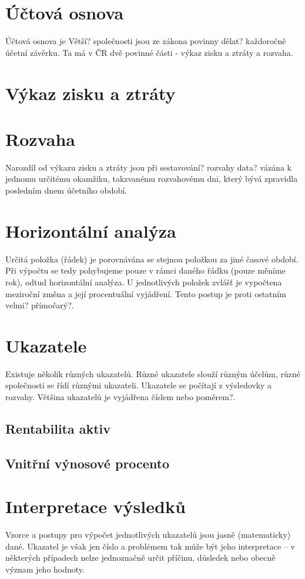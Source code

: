 \section{Účtová osnova}
Účtová osnova je 
Větší? společnosti jsou ze zákona povinny dělat? každoročně účetní závěrku. Ta má v ČR dvě povinné části - výkaz zisku a ztráty a rozvaha. 
\section{Výkaz zisku a ztráty}
\section{Rozvaha}
Narozdíl od výkazu zisku a ztráty jsou při sestavování? rozvahy data? vázána k jednomu určitému okamžiku, takzvanému rozvahovému dni, který bývá zpravidla posledním dnem účetního období.

\section{Horizontální analýza}
Určitá položka (řádek) je porovnávána se stejnou položkou za jiné časové období. Při výpočtu se tedy pohybujeme pouze v rámci daného řádku (pouze měníme rok), odtud horizontální analýza. U jednotlivých položek zvlášť je vypočtena meziroční změna a její procentuální vyjádření. Tento postup je proti ostatním velmi? přímočarý?.


\section{Ukazatele}
Existuje několik různých ukazatelů. Různé ukazatele slouží různým účelům, různé společnosti se řídí různými ukazateli. Ukazatele se počítají z výsledovky a rozvahy. Většina ukazatelů je vyjádřena číslem nebo poměrem?.
\subsection{Rentabilita aktiv}
\subsection{Vnitřní výnosové procento}

\section{Interpretace výsledků}
Vzorce a postupy pro výpočet jednotlivých ukazatelů jsou jasně (matematicky) dané. Ukazatel je však jen číslo a problémem tak může být jeho interpretace -- v některých případech nelze jednoznačně určit příčinu, důsledek nebo obecně význam jeho hodnoty. 

